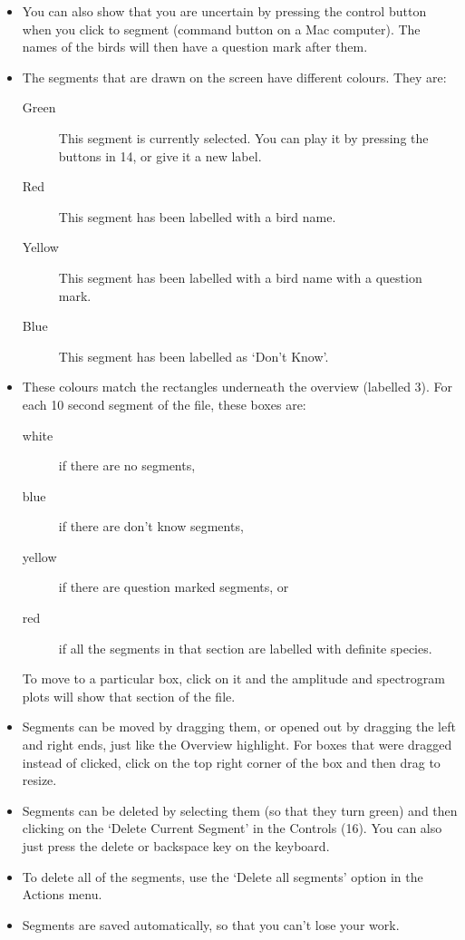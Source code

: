 \documentclass{article}
\begin{document}
\begin{itemize}
\item You can also show that you are uncertain by pressing the control button when you click to segment (command button on a Mac computer). The names of the birds will then have a question mark after them. 

\item The segments that are drawn on the screen have different colours. They are:
	\begin{description} 
	\item[Green] This segment is currently selected. You can play it by pressing the buttons in 14, or give it a new label. 
	\item[Red] This segment has been labelled with a bird name.
	\item[Yellow] This segment has been labelled with a bird name with a question mark.
	\item[Blue] This segment has been labelled as `Don't Know'.
	\end{description}

\item These colours match the rectangles underneath the overview (labelled 3). For each 10 second segment of the file, these boxes are:

	\begin{description} 
 	\item[white] if there are no segments, 
	\item[blue] if there are don't know segments, 
	\item[yellow] if there are question marked segments, or 
	\item[red] if all the segments in that section are labelled with definite species. 
	\end{description}
To move to a particular box, click on it and the amplitude and spectrogram plots will show that section of the file.  

\item Segments can be moved by dragging them, or opened out by dragging the left and right ends, just like the Overview highlight. For boxes that were dragged instead of clicked, click on the top right corner of the box and then drag to resize.

\item Segments can be deleted by selecting them (so that they turn green) and then clicking on the `Delete Current Segment' in the Controls (16). You can also just press the delete or backspace key on the keyboard. 

\item To delete all of the segments, use the `Delete all segments' option in the Actions menu. 

\item Segments are saved automatically, so that you can't lose your work.

\end{itemize}
\end{document}
